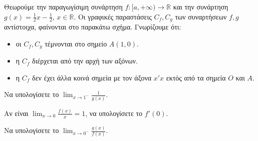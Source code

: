 Θεωρούμε την παραγωγίσιμη συνάρτηση $f: [a, +\infty) \rightarrow \mathbb{R}$ και την συνάρτηση $g(x) = \frac{1}{2}x - \frac{1}{2}$, $x \in \mathbb{R}$. Οι γραφικές παραστάσεις $C_f, C_g$ των συναρτήσεων $f, g$ αντίστοιχα, φαίνονται στο παρακάτω σχήμα. Γνωρίζουμε ότι:
\begin{itemize}
    \item οι $C_f, C_g$ τέμνονται στο σημείο $A(1, 0)$.
    \item η $C_f$ διέρχεται από την αρχή των αξόνων.
    \item η $C_f$ δεν έχει άλλα κοινά σημεία με τον άξονα $x'x$ εκτός από τα σημεία $O$ και $A$.
\end{itemize}
\begin{alist}
    \item Να υπολογίσετε το $\lim_{x \to 1^-} \frac{1}{g(x)}$. 
    \item Αν είναι $\lim_{x \to 0} \frac{f(x)}{x} = 1$, να υπολογίσετε το $f'(0)$. 
    \item Να υπολογίσετε το $\lim_{x \to 0^-} \frac{g(x)}{f(x)}$. 
\end{alist}